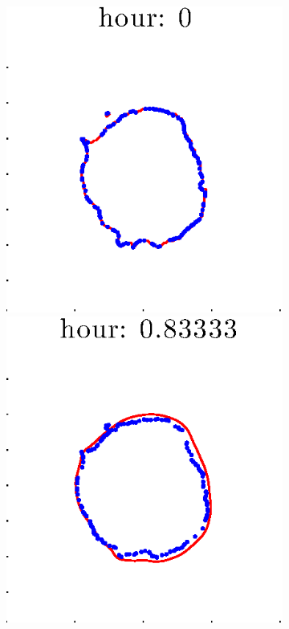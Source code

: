 \documentclass[12pt]{article}
\begin{document}
\begin{figure}[h!]
\begin{subfigure}[b]{.3\textwidth}
	\end{subfigure}
	\begin{subfigure}[b]{.3\textwidth}
	\centering
		\includegraphics[height=.15\textheight]{Pos0/firsthalf/first1.eps}
		\includegraphics[height=.15\textheight]{Pos0/firsthalf/first2.eps}

\end{subfigure}
\end{figure}
\end{document}
